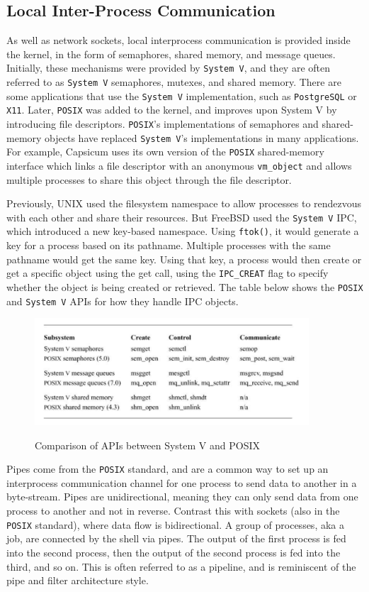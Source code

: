 \documentclass[12pt, dvipsnames, a4paper]{article}
\newcommand{\code}[1]{\texttt{#1}}
\begin{document}
\subsection{Local Inter-Process Communication}
As well as network sockets, local interprocess communication is provided inside the kernel, in the form of semaphores, shared memory, and message queues. Initially, these mechanisms were provided by \code{System V}, and they are often referred to as \code{System V} semaphores, mutexes, and shared memory. There are some applications that use the \code{System V} implementation, such as \code{PostgreSQL} or \code{X11}. Later, \code{POSIX} was added to the kernel, and improves upon System V by introducing file descriptors. \code{POSIX}’s implementations of semaphores and shared-memory objects have replaced \code{System V}’s implementations in many applications. For example, Capsicum uses its own version of the \code{POSIX} shared-memory interface which links a file descriptor with an anonymous \code{vm\_object} and allows multiple processes to share this object through the file descriptor.

Previously, UNIX used the filesystem namespace to allow processes to rendezvous with each other and share their resources. But FreeBSD used the \code{System V} IPC, which introduced a new key-based namespace. Using \code{ftok()}, it would generate a key for a process based on its pathname. Multiple processes with the same pathname would get the same key. Using that key, a process would then create or get a specific object using the get call, using the \code{IPC\_CREAT} flag to specify whether the object is being created or retrieved. The table below shows the \code{POSIX} and \code{System V} APIs for how they handle IPC objects.

\begin{figure}[hbt!]
	\centering
	\includegraphics[width=290pt]{assets/localipc1.png}
	\caption{Comparison of APIs between System V and POSIX} \cite{mckusick}
\end{figure}

Pipes come from the \code{POSIX} standard, and are a common way to set up an interprocess communication channel for one process to send data to another in a byte-stream. Pipes are unidirectional, meaning they can only send data from one process to another and not in reverse. Contrast this with sockets (also in the \code{POSIX} standard), where data flow is bidirectional. A group of processes, aka a job, are connected by the shell via pipes. The output of the first process is fed into the second process, then the output of the second process is fed into the third, and so on. This is often referred to as a pipeline, and is reminiscent of the pipe and filter architecture style.
\end{document}
